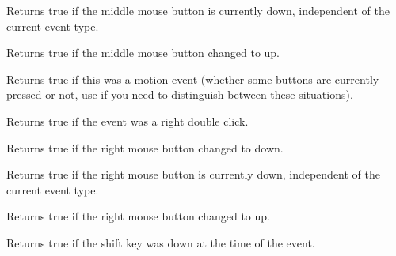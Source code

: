 \label{wxmouseeventmiddleisdown}


Returns true if the middle mouse button is currently down, independent
of the current event type.



Returns true if the middle mouse button changed to up.

\label{wxmouseeventmoving}


Returns true if this was a motion event (whether some buttons are currently
pressed or not, use  if you need to
distinguish between these situations).



Returns true if the event was a right double click.



Returns true if the right mouse button changed to down.

\label{wxmouseeventrightisdown}


Returns true if the right mouse button is currently down, independent
of the current event type.



Returns true if the right mouse button changed to up.



Returns true if the shift key was down at the time of the event.

